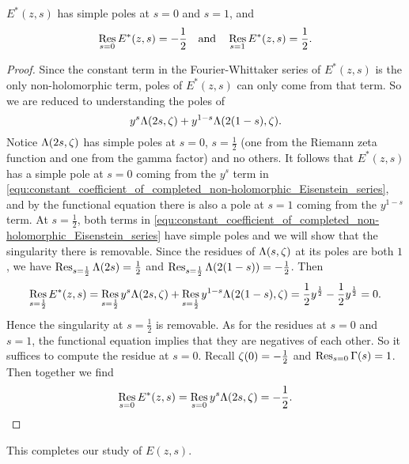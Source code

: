       \begin{proposition}\label{equ:completed_real-analytic_Eisenstein_series_residues}
        $E^{\ast}(z,s)$ has simple poles at $s = 0$ and $s = 1$, and
        \[
          \operatorname*{\mathrm{Res}}_{s = 0}E^{\ast}(z,s) = -\frac{1}{2} \quad \text{and} \quad \operatorname*{\mathrm{Res}}_{s = 1}E^{\ast}(z,s) = \frac{1}{2}.
        \]
      \end{proposition}
      \begin{proof}
        Since the constant term in the Fourier-Whittaker series of $E^{\ast}(z,s)$ is the only non-holomorphic term, poles of $E^{\ast}(z,s)$ can only come from that term. So we are reduced to understanding the poles of
        \begin{equation}\label{equ:constant_coefficient_of_completed_non-holomorphic_Eisenstein_series}
          y^{s}\Lambda(2s,\zeta)+y^{1-s}\Lambda(2(1-s),\zeta).
        \end{equation}
        Notice $\Lambda(2s,\zeta)$ has simple poles at $s = 0$, $s = \frac{1}{2}$ (one from the Riemann zeta function and one from the gamma factor) and no others. It follows that $E^{\ast}(z,s)$ has a simple pole at $s = 0$ coming from the $y^{s}$ term in
        \cref{equ:constant_coefficient_of_completed_non-holomorphic_Eisenstein_series}, and by the functional equation there is also a pole at $s = 1$ coming from the $y^{1-s}$ term. At $s = \frac{1}{2}$, both terms in \cref{equ:constant_coefficient_of_completed_non-holomorphic_Eisenstein_series} have simple poles and we will show that the singularity there is removable. Since the residues of $\Lambda(s,\zeta)$ at its poles are both $1$, we have $\operatorname*{\mathrm{Res}}_{s = \frac{1}{2}}\Lambda(2s) = \frac{1}{2}$ and $\operatorname*{\mathrm{Res}}_{s = \frac{1}{2}}\Lambda(2(1-s)) = -\frac{1}{2}$. Then
        \[
          \operatorname*{\mathrm{Res}}_{s = \frac{1}{2}}E^{\ast}(z,s) = \operatorname*{\mathrm{Res}}_{s = \frac{1}{2}}y^{s}\Lambda(2s,\zeta)+\operatorname*{\mathrm{Res}}_{s = \frac{1}{2}}y^{1-s}\Lambda(2(1-s),\zeta) = \frac{1}{2}y^{\frac{1}{2}}-\frac{1}{2}y^{\frac{1}{2}} = 0.
        \]
        Hence the singularity at $s = \frac{1}{2}$ is removable. As for the residues at $s = 0$ and $s = 1$, the functional equation implies that they are negatives of each other. So it suffices to compute the residue at $s = 0$. Recall $\zeta(0) = -\frac{1}{2}$ and $\operatorname*{\mathrm{Res}}_{s = 0}\Gamma(s) = 1$. Then together we find
        \[
          \operatorname*{\mathrm{Res}}_{s = 0}E^{\ast}(z,s) = \operatorname*{\mathrm{Res}}_{s = 0}y^{s}\Lambda(2s,\zeta) = -\frac{1}{2}.
        \]
      \end{proof}

      This completes our study of $E(z,s)$.
